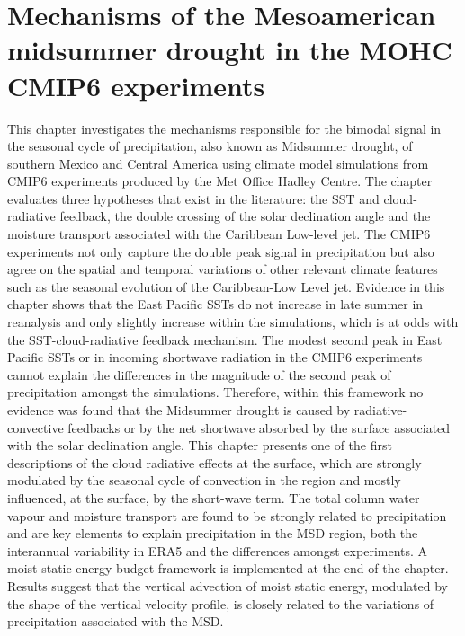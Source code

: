 
\chapter{\label{ch:6-msd}Mechanisms of the Mesoamerican midsummer drought in the MOHC CMIP6 experiments}

This chapter investigates the mechanisms responsible for the bimodal signal in the seasonal cycle of precipitation, also known as Midsummer drought, of southern Mexico and Central America using climate model simulations from CMIP6 experiments produced by the Met Office Hadley Centre.
The chapter evaluates three hypotheses that exist in the literature: the SST and cloud-radiative feedback, the double crossing of the solar declination angle and the moisture transport associated with the Caribbean Low-level jet. The CMIP6 experiments not only capture the double peak signal in precipitation but also agree on the spatial and temporal variations of other relevant climate features such as the seasonal evolution of the Caribbean-Low Level jet. 
Evidence in this chapter shows that the East Pacific SSTs do not increase in late summer in reanalysis and only slightly increase within the simulations, which is at odds with the SST-cloud-radiative feedback mechanism. 
The modest second peak in East Pacific SSTs or in incoming shortwave radiation in the CMIP6 experiments cannot explain the differences in the magnitude of the second peak of precipitation amongst the simulations. Therefore, within this framework no evidence was found that the Midsummer drought is caused by radiative-convective feedbacks or by the net shortwave absorbed by the surface associated with the solar declination angle.
 This chapter presents one of the first descriptions of the cloud radiative effects at the surface, which are strongly modulated by the seasonal cycle of convection in the region and mostly influenced, at the surface, by the short-wave term. The total column water vapour and moisture transport are found to be strongly related to precipitation and are key elements to explain precipitation in the MSD region, both the interannual variability in ERA5 and the differences amongst experiments. 
A moist static energy budget framework is implemented at the end of the chapter. Results suggest that the vertical advection of moist static energy, modulated by the shape of the vertical velocity profile, is closely related to the variations of precipitation associated with the MSD. 

